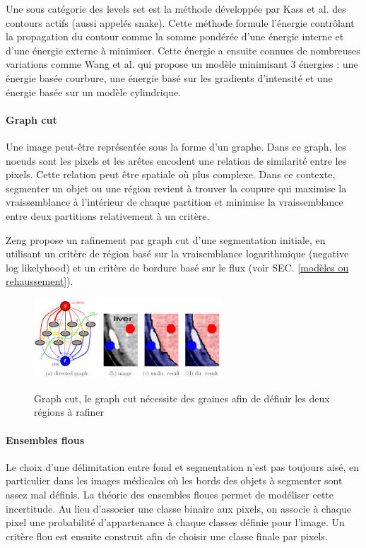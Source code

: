 Une sous catégorie des levels set est la méthode développée par Kass et al. \cite{Kass1988_snakes} des contours actifs (aussi appelés snake). Cette méthode formule l'énergie contrôlant la propagation du contour comme la somme pondérée d'une énergie interne et d'une énergie externe à minimiser. Cette énergie a ensuite connues de nombreuses variations comme Wang et al. \cite{Wang2012_vessel_level_set} qui propose un modèle minimisant 3 énergies : une énergie basée courbure, une énergie basé sur les gradients d'intensité et une énergie basée sur un modèle cylindrique. 

\paragraph{Graph cut}

Une image peut-être représentée sous la forme d'un graphe. Dans ce graph, les noeuds sont les pixels et les arêtes encodent une relation de similarité entre les pixels. Cette relation peut être spatiale où plus complexe. Dans ce contexte, segmenter un objet ou une région revient à trouver la coupure qui maximise la vraissemblance à l'intérieur de chaque partition et minimise la vraissemblance entre deux partitions relativement à un critère.

Zeng \cite{Zeng2017_liver_oof_graph_cut} propose un rafinement par graph cut d'une segmentation initiale, en utilisant un critère de région basé sur la vraisemblance logarithmique (negative log likelyhood) et un critère de bordure basé sur le flux (voir SEC. \ref{modèles ou rehaussement}).

\begin{figure}
  \centering
  \includegraphics[height=3cm]{Images/graph_cut.jpeg}
  \label{fig:Graph cut}
  \caption{Graph cut, le graph cut nécessite des graines afin de définir les deux régions à rafiner}
\end{figure}

\paragraph{Ensembles flous}

Le choix d'une délimitation entre fond et segmentation n'est pas toujours aisé, en particulier dans les images médicales où les bords des objets à segmenter sont assez mal définis. La théorie des ensembles floues permet de modéliser cette incertitude. Au lieu d'associer une classe binaire aux pixels, on associe à chaque pixel une probabilité d'appartenance à chaque classes définie pour l'image. Un critère flou est ensuite construit afin de choisir une classe finale par pixels.

